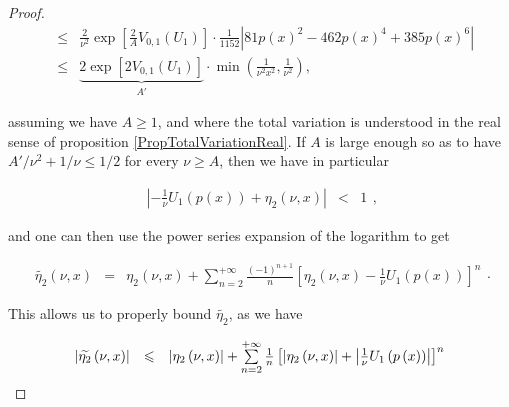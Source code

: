 \documentclass{jams-l}
\theoremstyle{definition}
\theoremstyle{remark}
\numberwithin{equation}{section}
\begin{document}
\begin{proof}
\[\begin{array}{lll}
                    & \leqslant & \frac{2}{\nu^2} \exp \left[ \frac{2}{A} V_{0,1} \left( U_1 \right) \right] \cdot \frac{1}{1152} \left \vert 81 p \left( x \right)^2 - 462 p \left( x \right)^4 + 385 p \left( x \right)^6 \right \vert \\[0.5em]
                    
                    & \leqslant & \underbrace{2 \exp \left[ 2 V_{0,1} \left( U_1 \right) \right]}_{A'} \cdot \min \left( \frac{1}{\nu^2 x^2}, \frac{1}{\nu^2} \right), 
                \end{array} \]
            
            \noindent assuming we have $A \geqslant 1$, and where the total variation is understood in the real sense of proposition \ref{PropTotalVariationReal}. If $A$ is large enough so as to have $A'/\nu^2 + 1/\nu \leqslant 1/2$ for every $\nu \geqslant A$, then we have in particular
            
            \[ \begin{array}{lll}
                    \left \vert - \frac{1}{\nu} U_1 \left( p \left( x \right) \right) + \eta_2 \left( \nu, x \right) \right \vert & < & 1
                \end{array} , \]
            
            \noindent and one can then use the power series expansion of the logarithm to get
            
            \[ \begin{array}{lll}
                    \widetilde{\eta_2} \left( \nu, x \right) & = & \eta_2 \left( \nu, x \right) + \sum\limits_{n=2}^{+ \infty} \frac{\left( -1 \right)^{n+1}}{n} \left[ \eta_2 \left( \nu, x \right) - \frac{1}{\nu} U_1 \left( p \left( x \right) \right) \right]^n
                \end{array} . \]
            
            \noindent This allows us to properly bound $\widetilde{\eta_2}$, as we have
            
            \[ \begin{array}{lllll}
                    \multicolumn{3}{l}{\left \vert \widetilde{\eta_2} \left( \nu, x \right) \right \vert} & \leqslant & \left \vert \eta_2 \left( \nu, x \right) \right \vert + \sum\limits_{n=2}^{+ \infty} \frac{1}{n} \left[ \left \vert \eta_2 \left( \nu, x \right) \right \vert + \left \vert \frac{1}{\nu} U_1 \left( p \left( x \right) \right) \right \vert \right]^n \\[0.5em]
                    

\end{array}\]
\end{proof}
\end{document}
